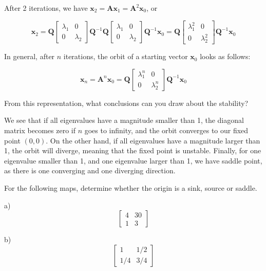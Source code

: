 After 2 iterations, we have $ {\mathbf x}_2 = {\mathbf A} {\mathbf x}_1 = {\mathbf A}^2 {\mathbf x}_0$, or

\begin{equation}
    {\mathbf x}_2 =  {\mathbf Q}
    \begin{bmatrix}
    \lambda_1 & 0 \\
    0 & \lambda_2
    \end{bmatrix} 
    {\mathbf Q^{-1}} {\mathbf Q}
    \begin{bmatrix}
    \lambda_1 & 0 \\
    0 & \lambda_2
    \end{bmatrix} 
    {\mathbf Q^{-1}} {\mathbf x}_0 =  {\mathbf Q}
    \begin{bmatrix}
    \lambda_1^2 & 0 \\
    0 & \lambda_2^2
    \end{bmatrix} 
    {\mathbf Q^{-1}} {\mathbf x}_0
\end{equation} 

In general, after $n$ iterations, the orbit of a starting vector ${\mathbf x}_0$ looks as follows:

\begin{equation}
{\mathbf x}_n = {\mathbf A}^n {\mathbf x}_0 = {\mathbf Q}
\begin{bmatrix}
\lambda_1^n & 0 \\
0 & \lambda_2^n
\end{bmatrix} 
{\mathbf Q^{-1}} {\mathbf x}_0 
\end{equation} 

\begin{cue}
From this representation, what conclusions can you draw about the stability?  
\end{cue}

We see that if all eigenvalues have a magnitude smaller than 1, the diagonal matrix becomes zero if $n$ goes to infinity, and the orbit converges to our fixed point $(0,0)$. On the other hand, if all eigenvalues have a magnitude larger than 1, the orbit will diverge, meaning that the fixed point is unstable. Finally, for one eigenvalue smaller than 1, and one eigenvalue larger than 1, we have saddle point, as there is one converging and one diverging direction.


\begin{exer}
For the following maps, determine whether the origin is a sink, source or saddle.

a) $$\begin{bmatrix}4 & 30 \\ 1 & 3 \end{bmatrix}$$

b) $$\begin{bmatrix}1 & 1/2 \\ 1/4 & 3/4 \end{bmatrix}$$

\end{exer}

